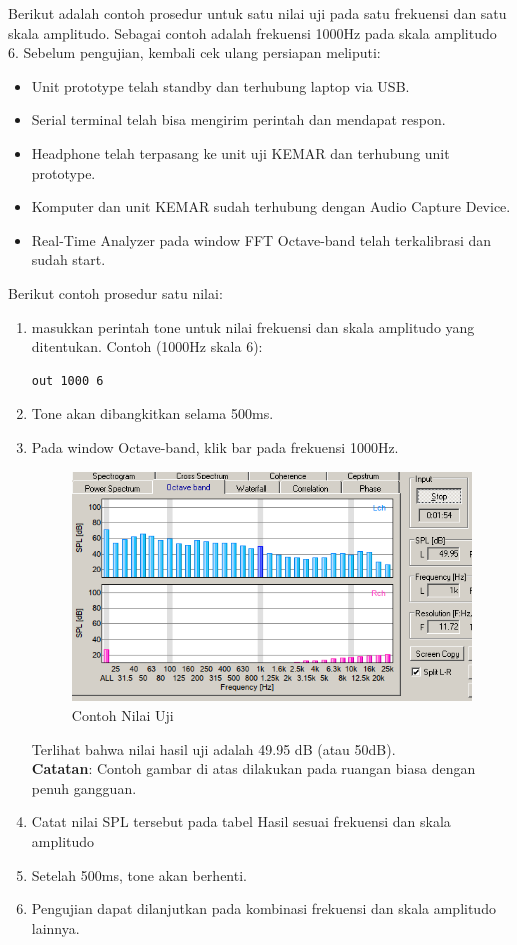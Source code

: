 \documentclass[12pt,]{article}
\begin{document}
	Berikut adalah contoh prosedur untuk satu nilai uji pada satu frekuensi dan satu skala amplitudo.
	Sebagai contoh adalah frekuensi 1000Hz pada skala amplitudo 6.
	Sebelum pengujian, kembali cek ulang persiapan meliputi:
	\begin{itemize}
		\item Unit prototype telah standby dan terhubung laptop via USB.
		\item Serial terminal telah bisa mengirim perintah dan mendapat respon.
		\item Headphone telah terpasang ke unit uji KEMAR dan terhubung unit prototype.
		\item Komputer dan unit KEMAR sudah terhubung dengan Audio Capture Device.
		\item Real-Time Analyzer pada window FFT Octave-band telah terkalibrasi dan sudah start.
	\end{itemize}

	Berikut contoh prosedur satu nilai:
	\begin{enumerate}
		\item masukkan perintah tone untuk nilai frekuensi dan skala amplitudo yang ditentukan.
		Contoh (1000Hz skala 6):
		\begin{verbatim}
out 1000 6
		\end{verbatim}
		
		\item Tone akan dibangkitkan selama 500ms.
		
		\item Pada window Octave-band, klik bar pada frekuensi 1000Hz.
		
			\begin{figure}[!ht]
			\centering
			\includegraphics[width=300pt]{images/terminal/contoh}
			\caption{Contoh Nilai Uji}
		\end{figure}
	
		Terlihat bahwa nilai hasil uji adalah 49.95 dB (atau 50dB).\\
		\textbf{Catatan}: Contoh gambar di atas dilakukan pada ruangan biasa dengan penuh gangguan.
		
		\item Catat nilai SPL tersebut pada tabel Hasil sesuai frekuensi dan skala amplitudo
		
		\item Setelah 500ms, tone akan berhenti.
		
		\item Pengujian dapat dilanjutkan pada kombinasi frekuensi dan skala amplitudo lainnya.
	\end{enumerate}
	
\end{document}
